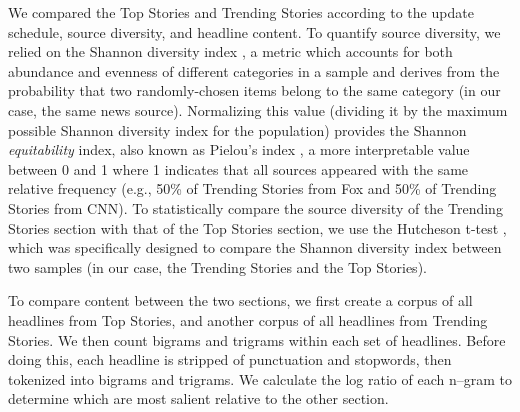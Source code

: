 
We compared the Top Stories and Trending Stories according to the update schedule, source diversity, and headline content. To quantify source diversity, we relied on the Shannon diversity index \citep{Shannon1948}, a metric which accounts for both abundance and evenness of different categories in a sample and derives from the probability that two randomly-chosen items belong to the same category (in our case, the same news source). Normalizing this value (dividing it by the maximum possible Shannon diversity index for the population) provides the Shannon \textit{equitability} index, also known as Pielou's index \citep{Pielou1966}, a more interpretable value between 0 and 1 where 1 indicates that all sources appeared with the same relative frequency (e.g., 50\% of Trending Stories from Fox and 50\% of Trending Stories from CNN). To statistically compare the source diversity of the Trending Stories section with that of the Top Stories section, we use the Hutcheson t-test \citep{Hutcheson1970}, which was specifically designed to compare the Shannon diversity index between two samples (in our case, the Trending Stories and the Top Stories).


To compare content between the two sections, we first create a corpus of all headlines from Top Stories, and another corpus of all headlines from Trending Stories. We then count bigrams and trigrams within each set of headlines. Before doing this, each headline is stripped of punctuation and stopwords, then tokenized into bigrams and trigrams. We calculate the log ratio \citep{Hardie2014} of each n--gram to determine which are most salient relative to the other section.

